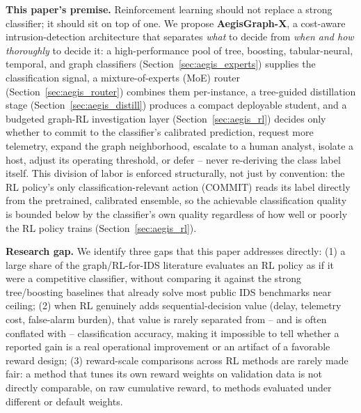 \documentclass[journal]{IEEEtran}
\begin{document}
\textbf{This paper's premise.} Reinforcement learning should not replace a
strong classifier; it should sit on top of one. We propose
\textbf{AegisGraph-X}, a cost-aware intrusion-detection architecture that
separates \emph{what} to decide from \emph{when and how thoroughly} to
decide it: a high-performance pool of tree, boosting, tabular-neural,
temporal, and graph classifiers (Section~\ref{sec:aegis_experts}) supplies
the classification signal, a mixture-of-experts (MoE) router
(Section~\ref{sec:aegis_router}) combines them per-instance, a tree-guided
distillation stage (Section~\ref{sec:aegis_distill}) produces a compact
deployable student, and a budgeted graph-RL investigation layer
(Section~\ref{sec:aegis_rl}) decides only whether to commit to the
classifier's calibrated prediction, request more telemetry, expand the graph
neighborhood, escalate to a human analyst, isolate a host, adjust its
operating threshold, or defer -- never re-deriving the class label itself.
This division of labor is enforced structurally, not just by convention: the
RL policy's only classification-relevant action (COMMIT) reads its label
directly from the pretrained, calibrated ensemble, so the achievable
classification quality is bounded below by the classifier's own quality
regardless of how well or poorly the RL policy trains
(Section~\ref{sec:aegis_rl}).

\textbf{Research gap.} We identify three gaps that this paper addresses
directly: (1) a large share of the graph/RL-for-IDS literature evaluates an
RL policy as if it were a competitive classifier, without comparing it
against the strong tree/boosting baselines that already solve most public IDS
benchmarks near ceiling; (2) when RL genuinely adds sequential-decision value
(delay, telemetry cost, false-alarm burden), that value is rarely separated
from -- and is often conflated with -- classification accuracy, making it
impossible to tell whether a reported gain is a real operational improvement
or an artifact of a favorable reward design; (3) reward-scale comparisons
across RL methods are rarely made fair: a method that tunes its own reward
weights on validation data is not directly comparable, on raw cumulative
reward, to methods evaluated under different or default weights.
\end{document}
